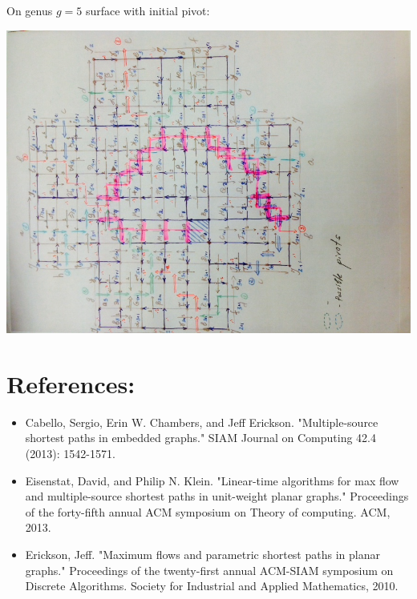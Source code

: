 \documentclass{article}
\begin{document}
\newpage
On genus $g = 5$ surface with initial pivot:
\begin{center}
\includegraphics[angle = -90, scale = 0.7]{genus4_after5Pivots.jpg}
\end{center}




\newpage
\section{References:}
\begin{itemize}
\item Cabello, Sergio, Erin W. Chambers, and Jeff Erickson. "Multiple-source 
  shortest paths in embedded graphs." SIAM Journal on Computing 42.4 (2013): 1542-1571.
\item Eisenstat, David, and Philip N. Klein. "Linear-time algorithms for max 
  flow and multiple-source shortest paths in unit-weight planar graphs." 
  Proceedings of the forty-fifth annual ACM symposium on Theory of computing. ACM, 2013.
\item Erickson, Jeff. "Maximum flows and parametric shortest paths in planar graphs." 
  Proceedings of the twenty-first annual ACM-SIAM symposium on Discrete Algorithms. 
  Society for Industrial and Applied Mathematics, 2010.
\end{itemize}
\end{document}
